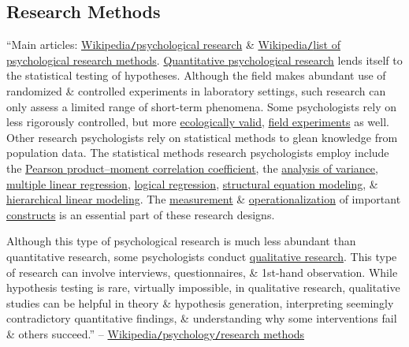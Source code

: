 \documentclass[oneside]{book}
\numberwithin{equation}{section}
\begin{document}
\subsection{Research Methods}
``Main articles: \href{https://en.wikipedia.org/wiki/Psychological_research}{Wikipedia\texttt{/}psychological research} \& \href{https://en.wikipedia.org/wiki/List_of_psychological_research_methods}{Wikipedia\texttt{/}list of psychological research methods}. \href{https://en.wikipedia.org/wiki/Quantitative_psychological_research}{Quantitative psychological research} lends itself to the statistical testing of hypotheses. Although the field makes abundant use of randomized \& controlled experiments in laboratory settings, such research can only assess a limited range of short-term phenomena. Some psychologists rely on less rigorously controlled, but more \href{https://en.wikipedia.org/wiki/Ecological_validity}{ecologically valid}, \href{https://en.wikipedia.org/wiki/Field_experiments}{field experiments} as well. Other research psychologists rely on statistical methods to glean knowledge from population data. The statistical methods research psychologists employ include the \href{https://en.wikipedia.org/wiki/Pearson_product%E2%80%93moment_correlation_coefficient}{Pearson product--moment correlation coefficient}, the \href{https://en.wikipedia.org/wiki/Analysis_of_variance}{analysis of variance}, \href{https://en.wikipedia.org/wiki/Multiple_linear_regression}{multiple linear regression}, \href{https://en.wikipedia.org/wiki/Logistic_regression}{logical regression}, \href{https://en.wikipedia.org/wiki/Structural_equation_modeling}{structural equation modeling}, \& \href{https://en.wikipedia.org/wiki/Hierarchical_linear_modeling}{hierarchical linear modeling}. The \href{https://en.wikipedia.org/wiki/Psychometrics}{measurement} \& \href{https://en.wikipedia.org/wiki/Operational_definition}{operationalization} of important \href{https://en.wikipedia.org/wiki/Construct_(psychology)}{constructs} is an essential part of these research designs.

Although this type of psychological research is much less abundant than quantitative research, some psychologists conduct \href{https://en.wikipedia.org/wiki/Qualitative_research}{qualitative research}. This type of research can involve interviews, questionnaires, \& 1st-hand observation. While hypothesis testing is rare, virtually impossible, in qualitative research, qualitative studies can be helpful in theory \& hypothesis generation, interpreting seemingly contradictory quantitative findings, \& understanding why some interventions fail \& others succeed.'' -- \href{https://en.wikipedia.org/wiki/Psychology#Research_methods}{Wikipedia\texttt{/}psychology\texttt{/}research methods}
\end{document}
